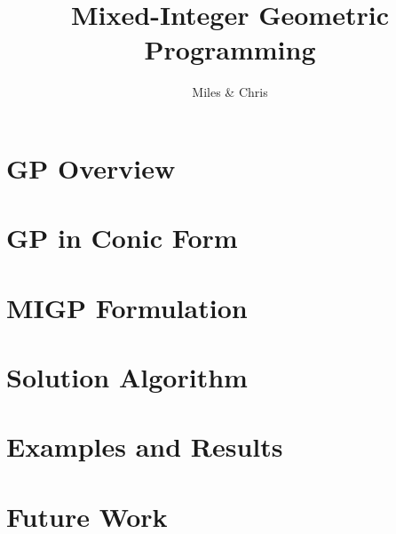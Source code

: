 \documentclass[]{article}
\title{Mixed-Integer Geometric Programming}
\author{Miles \& Chris}
\date{}
\begin{document}
\maketitle

\section{GP Overview}



\section{GP in Conic Form}



\section{MIGP Formulation}



\section{Solution Algorithm}



\section{Examples and Results}



\section{Future Work}








\begin{thebibliography}{9}


  
\end{thebibliography}
\end{document}
